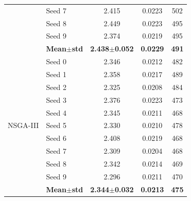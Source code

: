 \begin{table}[H]
\begin{tabular}{@{}llccc@{}}
  & Seed 7 & {\small 2.415} & {\small 0.0223} & {\small 502} \\
  & Seed 8 & {\small 2.449} & {\small 0.0223} & {\small 495} \\
  & Seed 9 & {\small 2.374} & {\small 0.0219} & {\small 495} \\
  & \textbf{Mean$\pm$std} & \textbf{2.438$\pm$0.052} & \cellcolor{ForestGreen!25}\textbf{0.0229} & \textbf{491} \\
\midrule
\multirow{11}{*}{NSGA-III}
  & Seed 0 & {\small 2.346} & {\small 0.0212} & {\small 482} \\
  & Seed 1 & {\small 2.358} & {\small 0.0217} & {\small 489} \\
  & Seed 2 & {\small 2.325} & {\small 0.0208} & {\small 484} \\
  & Seed 3 & {\small 2.376} & {\small 0.0223} & {\small 473} \\
  & Seed 4 & {\small 2.345} & {\small 0.0211} & {\small 468} \\
  & Seed 5 & {\small 2.330} & {\small 0.0210} & {\small 478} \\
  & Seed 6 & {\small 2.408} & {\small 0.0219} & {\small 468} \\
  & Seed 7 & {\small 2.309} & {\small 0.0204} & {\small 468} \\
  & Seed 8 & {\small 2.342} & {\small 0.0214} & {\small 469} \\
  & Seed 9 & {\small 2.296} & {\small 0.0211} & {\small 470} \\
  & \textbf{Mean$\pm$std} & \textbf{2.344$\pm$0.032} & \cellcolor{ForestGreen!25}\textbf{0.0213} & \textbf{475} \\
\bottomrule
\end{tabular}
\end{table}

